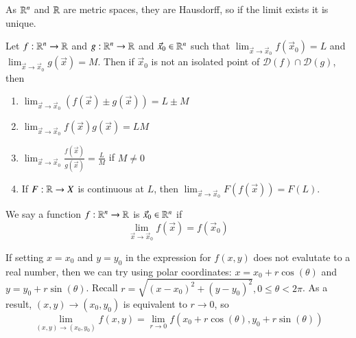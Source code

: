 \documentclass[12pt, a4paper, oneside, openright, titlepage]{book}
\begin{document}
\begin{appendices}
    
    \begin{rmk}
        As $\mathbb R^n$ and $\mathbb R$ are metric spaces, they are Hausdorff, so if the limit exists it is unique.
    \end{rmk}


    \begin{rmk}
        Let $f:\mathbb R^n\rightarrow \mathbb R$ and $g:\mathbb R^n\rightarrow \mathbb R$ and $\vec{x}_0\in \mathbb R^n$ such that $\lim_{\vec{x}\rightarrow \vec{x}_0}f(\vec{x}_0) = L$ and $\lim_{\vec{x}\rightarrow \vec{x}_0}g(\vec{x}) = M$. Then if $\vec{x}_0$ is not an isolated point of $\mathscr{D}(f) \cap \mathscr{D}(g)$, then \begin{enumerate}
            \item $\lim_{\vec{x}\rightarrow \vec{x}_0}(f(\vec{x}) \pm g(\vec{x})) = L \pm M$
            \item $\lim_{\vec{x}\rightarrow \vec{x}_0}f(\vec{x})g(\vec{x}) = LM$
            \item $\lim_{\vec{x}\rightarrow \vec{x}_0}\frac{f(\vec{x})}{g(\vec{x})} = \frac{L}{M}$ if $M \neq 0$
            \item If $F:\mathbb R\rightarrow X$ is continuous at $L$, then $\lim_{\vec{x}\rightarrow \vec{x}_0}F(f(\vec{x})) = F(L)$.
        \end{enumerate}
    \end{rmk}

    \begin{defn}
        We say a function $f:\mathbb R^n\rightarrow \mathbb R$ is  $\vec{x}_0\in \mathbb R^n$ if \begin{equation}
            \lim_{\vec{x}\rightarrow \vec{x}_0} f(\vec{x}) = f(\vec{x}_0)
        \end{equation}
    \end{defn}


    

    \begin{rmk}
        If setting $x = x_0$ and $y = y_0$ in the expression for $f(x,y)$ does not evalutate to a real number, then we can try using polar coordinates: $x = x_0 + r\cos(\theta)$ and $y = y_0 + r\sin(\theta)$. Recall $r = \sqrt{(x-x_0)^2 + (y-y_0)^2}, 0 \leq \theta < 2\pi$. As a result, $(x,y) \rightarrow (x_0,y_0)$ is equivalent to $r\rightarrow 0$, so \begin{equation}
            \lim\limits_{(x,y) \rightarrow (x_0,y_0)}f(x,y) = \lim\limits_{r\rightarrow 0}f(x_0+r\cos(\theta), y_0+r\sin(\theta))
        \end{equation}
    \end{rmk}


\end{appendices}
\end{document}
